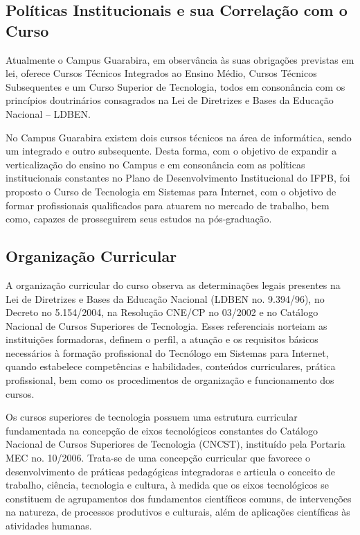 \subsection{Pol\'iticas Institucionais e sua Correla\c{c}\~ao com o Curso}

        Atualmente o Campus Guarabira, em observância às suas obrigações previstas em lei, oferece Cursos Técnicos Integrados ao Ensino Médio, Cursos Técnicos Subsequentes e um Curso Superior de Tecnologia, todos em consonância com os princípios doutrinários consagrados na Lei de Diretrizes e Bases da Educação Nacional – LDBEN. 

        No Campus Guarabira existem dois cursos técnicos na \'area de inform\'atica, sendo um integrado e outro subsequente. Desta forma, com o objetivo de expandir a verticalização do ensino no Campus e em consonância com as políticas institucionais constantes no Plano de Desenvolvimento Institucional do IFPB, foi proposto o Curso de Tecnologia em Sistemas para Internet, com o objetivo de formar profissionais qualificados para atuarem no mercado de trabalho, bem como, capazes de prosseguirem seus estudos na pós-graduação. 


\subsection{Organiza\c{c}\~ao Curricular}

	A organização curricular do curso observa as determinações legais presentes na Lei de Diretrizes e Bases da Educação Nacional (LDBEN no. 9.394/96), no Decreto no 5.154/2004, na Resolução CNE/CP no 03/2002 e no Catálogo Nacional de Cursos Superiores de Tecnologia. Esses referenciais norteiam as instituições formadoras, definem o perfil, a atuação e os requisitos básicos necessários à formação profissional do Tecnólogo em Sistemas para Internet, quando estabelece competências e habilidades, conteúdos curriculares, prática profissional, bem como os procedimentos de organização e funcionamento dos cursos.

	Os cursos superiores de tecnologia possuem uma estrutura curricular fundamentada na concepção de eixos tecnológicos constantes do Catálogo Nacional de Cursos Superiores de Tecnologia (CNCST), instituído pela Portaria MEC no. 10/2006. Trata-se de uma concepção curricular que favorece o desenvolvimento de práticas pedagógicas integradoras e articula o conceito de trabalho, ciência, tecnologia e cultura, à medida que os eixos tecnológicos se constituem de agrupamentos dos fundamentos científicos comuns, de intervenções na natureza, de processos produtivos e culturais, além de aplicações científicas às atividades humanas.

